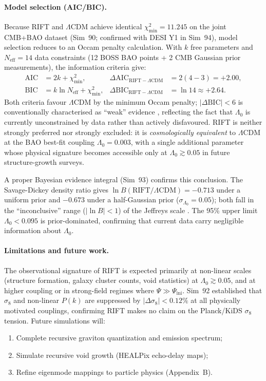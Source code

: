 \documentclass[12pt,a4paper]{article}
\begin{document}
\paragraph{Model selection (AIC/BIC).}
Because RIFT and $\Lambda$CDM achieve identical $\chi^2_{\min} = 11.245$ on the joint
CMB+BAO dataset (Sim~90; confirmed with DESI Y1 in Sim~94), model selection reduces
to an Occam penalty calculation.  With $k$ free parameters and
$N_{\mathrm{eff}} = 14$ data constraints (12 BOSS BAO points + 2 CMB Gaussian prior
measurements), the information criteria give:
\begin{align}
  \mathrm{AIC} &= 2k + \chi^2_{\min}, & \Delta\mathrm{AIC}_{\mathrm{RIFT}-\Lambda\mathrm{CDM}} &= 2(4-3) = +2.00, \\
  \mathrm{BIC} &= k\ln N_{\mathrm{eff}} + \chi^2_{\min}, & \Delta\mathrm{BIC}_{\mathrm{RIFT}-\Lambda\mathrm{CDM}} &= \ln 14 \approx +2.64.
\end{align}
Both criteria favour $\Lambda$CDM by the minimum Occam penalty; $|\Delta\mathrm{BIC}| < 6$
is conventionally characterised as ``weak'' evidence \citep{Jeffreys1961}, reflecting the
fact that $\Lambda_0$ is currently unconstrained by data rather than actively
disfavoured. RIFT is neither strongly preferred nor strongly excluded: it is
\emph{cosmologically equivalent} to $\Lambda$CDM at the BAO best-fit coupling
$\Lambda_0 = 0.003$, with a single additional parameter whose physical signature
becomes accessible only at $\Lambda_0 \gtrsim 0.05$ in future structure-growth surveys.

A proper Bayesian evidence integral (Sim~93) confirms this conclusion.  The
Savage-Dickey density ratio gives $\ln B(\mathrm{RIFT}/\Lambda\mathrm{CDM}) = -0.713$
under a uniform prior and $-0.673$ under a half-Gaussian prior
($\sigma_{\Lambda_0} = 0.05$); both fall in the ``inconclusive'' range
($|\ln B| < 1$) of the Jeffreys scale \citep{Jeffreys1961}.
The 95\% upper limit $\Lambda_0 < 0.095$ is prior-dominated, confirming
that current data carry negligible information about $\Lambda_0$.

\paragraph{Limitations and future work.}
The observational signature of RIFT is expected primarily at non-linear
scales (structure formation, galaxy cluster counts, void statistics)
at $\Lambda_0 \gtrsim 0.05$, and at higher coupling or in strong-field regimes
where $\Psi \gg \Psi_{\mathrm{ini}}$. Sim~92 established that $\sigma_8$ and
non-linear $P(k)$ are suppressed by $|\Delta\sigma_8| < 0.12\%$ at all
physically motivated couplings, confirming RIFT makes no claim on the
Planck/KiDS $\sigma_8$ tension. Future simulations will:
\begin{enumerate}
  \item Complete recursive graviton quantization and emission spectrum;
  \item Simulate recursive void growth (HEALPix echo-delay maps);
  \item Refine eigenmode mappings to particle physics (Appendix~B).
\end{enumerate}
\end{document}
